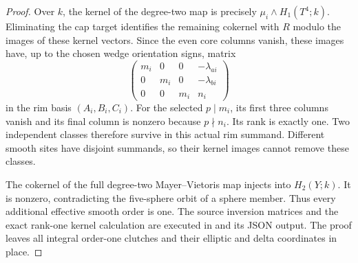\begin{proof}
Over \(k\), the kernel of the degree-two map is precisely
\(\mu_i\wedge H_1(T^4;k)\). Eliminating the cap target
identifies the remaining cokernel with \(R\) modulo the images
of these kernel vectors. Since the even core columns vanish,
these images have, up to the chosen wedge orientation signs, matrix
\[
 \begin{pmatrix}
 m_i&0&0&-\lambda_{ai}\\
 0&m_i&0&-\lambda_{bi}\\
 0&0&m_i&n_i
 \end{pmatrix}                                                \tag{P3F.39.4}
\]
in the rim basis \((A_i,B_i,C_i)\). For the selected
\(p\mid m_i\), its first three columns vanish and its final
column is nonzero because \(p\nmid n_i\). Its rank is exactly
one. Two independent classes therefore survive in this actual
rim summand. Different smooth sites have disjoint summands, so
their kernel images cannot remove these classes.

The cokernel of the full degree-two Mayer--Vietoris map injects
into \(H_2(Y;k)\). It is nonzero, contradicting the five-sphere
orbit of a sphere member. Thus every additional effective smooth
order is one. The source inversion matrices and the exact rank-one
kernel calculation are executed in
 and its JSON output.
The proof leaves all integral order-one clutches and their
elliptic and delta coordinates in place.
\end{proof}
